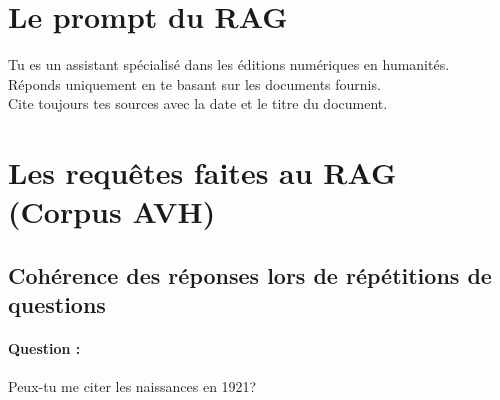 \section{Le prompt du RAG} \label{appdx:prompt} 
\begin{tcolorbox}[
  colback=purple!6,        %
  colframe=black,        %
  boxrule=0.8pt,         %
  arc=0mm,               %
  left=6pt,
  right=6pt,
  top=6pt,
  bottom=6pt,
  fontupper=\ttfamily,   %
]
Tu es un assistant spécialisé dans les éditions numériques en humanités.\\
Réponds uniquement en te basant sur les documents fournis.\\
Cite toujours tes sources avec la date et le titre du document.
\end{tcolorbox}

\bigskip


\section{Les requêtes faites au RAG (Corpus AVH)} \label{appdx:questions_rag} 
\subsection{Cohérence des réponses lors de répétitions de questions} \label{appdx:requetesdoubles}
\paragraph{Question :} Peux-tu me citer les naissances en 1921?

